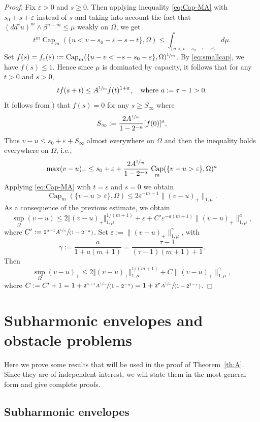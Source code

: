 \documentclass[11pt]{article}
\newcommand{\ie}{i.e.,\xspace}
\numberwithin{equation}{section}
\newcommand{\spfrac}[2]{\sfrac{#1}{(#2)}}
\theoremstyle{definition}
\DeclareMathOperator{\Capa}{Cap}
\theoremstyle{plain}
\theoremstyle{definition}
\begin{document}
\begin{proof}
Fix $\varepsilon > 0$ and $s \geq 0$. Then applying inequality \eqref{eq:Cap-MA} with $s_0 + s + \varepsilon$ instead of $s$ and taking into account the fact that $(dd^c u)^m \wedge \beta^{n - m} \leq \mu$ weakly on $\Omega$, we get
\begin{equation} \label{eq:cap-mu}
t^m \Capa_m(\{u< v - s_0 - \varepsilon - s -t\},\Omega)\leq \int_{\{u<v -s_0 - \varepsilon - s\}} d \mu.
\end{equation}
Set $ f (s) = f_\varepsilon (s):=\Capa_m(\{u-v<-s - s_0 -\varepsilon\},\Omega)^{\sfrac{1}{m}}$. By \eqref{eq:smallcap}, we have $f (s) \leq 1$. Hence since $\mu$ is dominated by capacity, it follows that for any $t > 0$ and $s > 0$,
\[
t f (s + t) \leq A^{\sfrac{1}{m}} f (t)^{1 + a}, \quad \text{where } a:= \tau - 1 > 0.
\]
It follows from \cite[Lem.\,2.4]{EGZ09}) that $f (s) = 0$ for any $s\geq S_\infty$ where
\[
S_\infty:=\frac{2 A^{\sfrac{1}{m}} }{1-2^{-a}} [f (0)]^{a},
\]
Thus $v-u\leq s_0 + \varepsilon + S_\infty$ almost everywhere on $\Omega$ and then the inequality holds everywhere on $\Omega$, \ie
\[
\max (v-u)_+ \leq s_ 0 + \varepsilon + \frac{2 A^{\sfrac{1}{m}}}{1-2^{-a}}\, \Capa_m(\{v - u >\varepsilon\},\Omega)^{a}
\]
Applying \eqref{eq:Cap-MA} with $t=\varepsilon$ and $s = 0$ we obtain
\[
\Capa_m(\{v - u > \varepsilon\},\Omega)\leq 2 \varepsilon^{-m-1}\|(v-u)_+\|_{1,\mu}.
\]
As a consequence of the previous estimate, we obtain
\[
\sup_\Omega(v-u)\leq 2 \Vert (v-u)_+\Vert_{1,\mu}^{1 \slash (m+1)} + \varepsilon+ C' \varepsilon^{-a (m+1)}\|(v-u)_+\|^{a}_{1,\mu},
\]
where $C':= \spfrac{2^{a + 1} A^{\sfrac{1}{m}}}{1-2^{-a}}$.
Set $\varepsilon:=\|(v-u)_+\|^\gamma_{1,\mu}$, with
\[
\gamma:=\frac{a}{1 +a(m+1)} = \frac{\tau - 1}{(\tau - 1) (m + 1) + 1}.
\]
Then
\[
\sup_{\Omega}(v-u)_+\leq 2 \Vert (v-u)_+\Vert_{1,\mu}^{1 \slash (m+1)} + C \|(v-u)_+\|^\gamma_{1,\mu},
\]
where $C:= C' + 1 = 1 + \spfrac{2^{a + 1} A^{\sfrac{1}{m}}}{1-2^{-a}} = 1 + \spfrac{2^{\tau} A^{\sfrac{1}{m}}}{1-2^{1 -\tau}}$.
\end{proof}

\section{Subharmonic envelopes and obstacle problems}\label{sec:3}
Here we prove some results that will be used in the proof of Theorem~\ref{th:A}. Since they are of independent interest, we will state them in the most general form and give complete proofs.

\subsection{Subharmonic envelopes }
\end{document}
